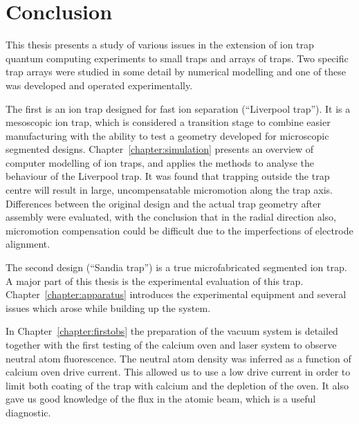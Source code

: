 \setcounter{chapter}{7} %
\chapter{Conclusion}
\label{chapter:conclusion}

This thesis presents a study of various issues in the extension of ion trap quantum computing experiments to small traps and arrays of traps. Two specific trap arrays were studied in some detail by numerical modelling and one of these was developed and operated experimentally.

The first is an ion trap designed for fast ion separation (``Liverpool trap''). It is a mesoscopic ion trap, which is considered a transition stage to combine easier manufacturing with the ability to test a geometry developed for microscopic segmented designs. Chapter~\ref{chapter:simulation} presents an overview of computer modelling of ion traps, and applies the methods to analyse the behaviour of the Liverpool trap. It was found that trapping outside the trap centre will result in large, uncompensatable micromotion along the trap axis. Differences between the original design and the actual trap geometry after assembly were evaluated, with the conclusion that in the radial direction also, micromotion compensation could be difficult due to the imperfections of electrode alignment. 

The second design (``Sandia trap'') is a true microfabricated segmented ion trap. A major part of this thesis is the experimental evaluation of this trap. Chapter~\ref{chapter:apparatus} introduces the experimental equipment and several issues which arose while building up the system.

In Chapter~\ref{chapter:firstobs} the preparation of the vacuum system is detailed together with the first testing of the calcium oven and laser system to observe neutral atom fluorescence. The neutral atom density was inferred as a function of calcium oven drive current. This allowed us to use a low drive current in order to limit both coating of the trap with calcium and the depletion of the oven. It also gave us good knowledge of the flux in the atomic beam, which is a useful diagnostic.

